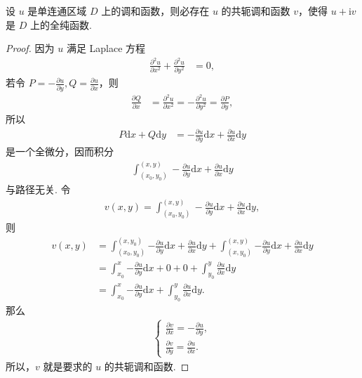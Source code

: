 \documentclass[../../main.tex]{subfiles}%
\begin{document}
\begin{theorem}
设 $u$ 是单连通区域 $D$ 上的调和函数，则必存在 $u$ 的共轭调和函数 $v$，使得 $u + \mathrm{i}v$ 是 $D$ 上的全纯函数.
\end{theorem}
\begin{proof}

因为 $u$ 满足 Laplace 方程
\begin{align*}
\frac{\partial^2 u}{\partial x^2} + \frac{\partial^2 u}{\partial y^2} &= 0,
\end{align*}
若令 $P = -\frac{\partial u}{\partial y}, Q = \frac{\partial u}{\partial x}$，则
\begin{align*}
\frac{\partial Q}{\partial x} &= \frac{\partial^2 u}{\partial x^2} = -\frac{\partial^2 u}{\partial y^2} = \frac{\partial P}{\partial y},
\end{align*}
所以
\begin{align*}
P \mathrm{d}x + Q \mathrm{d}y &= -\frac{\partial u}{\partial y} \mathrm{d}x + \frac{\partial u}{\partial x} \mathrm{d}y
\end{align*}
是一个全微分，因而积分
\begin{align*}
\int_{(x_0, y_0)}^{(x, y)} -\frac{\partial u}{\partial y} \mathrm{d}x + \frac{\partial u}{\partial x} \mathrm{d}y
\end{align*}
与路径无关. 令
\begin{align*}
v(x, y) = \int_{(x_0, y_0)}^{(x, y)} -\frac{\partial u}{\partial y} \mathrm{d}x + \frac{\partial u}{\partial x} \mathrm{d}y,
\end{align*}
则
\begin{align*}
v(x,y)&=\int_{(x_0,y_0)}^{(x,y_0)}{-\frac{\partial u}{\partial y}\mathrm{d}x+\frac{\partial u}{\partial x}\mathrm{d}y}+\int_{(x,y_0)}^{(x,y)}{-\frac{\partial u}{\partial y}\mathrm{d}x+\frac{\partial u}{\partial x}\mathrm{d}y}
\\
&=\int_{x_0}^x{-\frac{\partial u}{\partial y}\mathrm{d}x}+0+0+\int_{y_0}^y{\frac{\partial u}{\partial x}\mathrm{d}y}
\\
&=\int_{x_0}^x{-\frac{\partial u}{\partial y}\mathrm{d}x}+\int_{y_0}^y{\frac{\partial u}{\partial x}\mathrm{d}y}.
\end{align*}
那么
\begin{align*}
\begin{cases} 
\displaystyle \frac{\partial v}{\partial x} = -\frac{\partial u}{\partial y}, \\
\displaystyle \frac{\partial v}{\partial y} = \frac{\partial u}{\partial x}.
\end{cases}
\end{align*}
所以，$v$ 就是要求的 $u$ 的共轭调和函数.

\end{proof}
\end{document}

